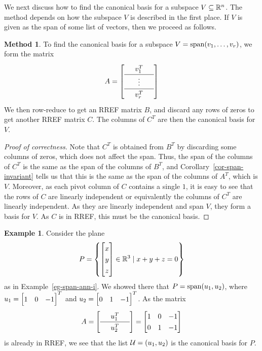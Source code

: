 \documentclass[reqno]{amsart}
\theoremstyle{definition}
\newtheorem{example}[theorem]{Example}
\newtheorem{method}[theorem]{Method}
\begin{document}
We next discuss how to find the canonical basis for a subspace
$V\subseteq{\mathbb{R}}^n$.  The method depends on how the subspace $V$ is described
in the first place.  If $V$ is given as the span of some list of
vectors, then we proceed as follows.

\begin{method}\label{meth-span-canonical}
 To find the canonical basis for a subspace $V=\operatorname{span}(v_1,\dotsc,v_r)$,
 we form the matrix
 \[ \renewcommand{\arraystretch}{1.3}
    A = \left[\begin{array}{ccc}
         & v_1^T & \\ \hline
         & \vdots & \\ \hline
         & v_r^T &
        \end{array}\right]
 \]
 We then row-reduce to get an RREF matrix $B$, and discard any rows of
 zeros to get another RREF matrix $C$.  The columns of $C^T$ are then
 the canonical basis for $V$.
\end{method}

\begin{proof}[Proof of correctness]
 Note that $C^T$ is obtained from $B^T$ by discarding some columns of
 zeros, which does not affect the span.  Thus, the span of the columns
 of $C^T$ is the same as the span of the columns of $B^T$, and
 Corollary~\ref{cor-span-invariant} tells us that this is the same as
 the span of the columns of $A^T$, which is $V$.  Moreover, as each
 pivot column of $C$ contains a single $1$, it is easy to see that the
 rows of $C$ are linearly independent or equivalently the columns of
 $C^T$ are linearly independent.  As they are linearly independent and
 span $V$, they form a basis for $V$.  As $C$ is in RREF, this must be
 the canonical basis.
\end{proof}

\begin{example}\label{eg-span-ann-i-canonical}
 Consider the plane
 \[ P = \left\{\bbm x\\ y\\ z\ebm \in\R^3\st x+y+z= 0\right\}  \]
 as in Example~\ref{eg-span-ann-i}.  We showed there that
 $P=\operatorname{span}(u_1,u_2)$, where $u_1=\bbm 1&0&-1\ebm^T$ and
 $u_2=\bbm 0&1&-1\ebm^T$.  As the matrix
 \[ A = {\renewcommand{\arraystretch}{1.3}
        \left[\begin{array}{ccc}
         & u_1^T & \\ \hline
         & u_2^T &
        \end{array}\right]}
      = \bbm 1 & 0 & -1 \\ 0 & 1 & -1 \ebm
 \]
 is already in RREF, we see that the list $\mathcal{U}=(u_1,u_2)$ is the
 canonical basis for $P$.
\end{example}
\end{document}
